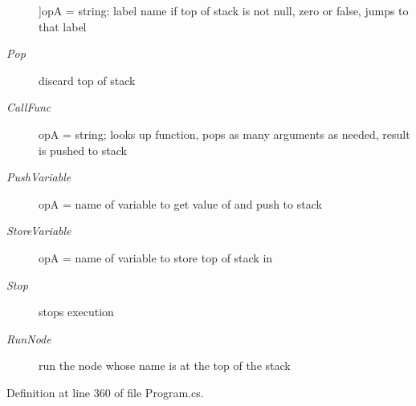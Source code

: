 \begin{Desc}
\begin{description}
{}]op\-A = string\-: label name if top of stack is not null, zero or false, jumps to that label \item[{\em 
\hypertarget{a00041_ad5dfb6ee68ca7469623ad3e459f98894a0ae61bd0474e04c9f1195d4baa0213a0}{Pop}\label{a00041_ad5dfb6ee68ca7469623ad3e459f98894a0ae61bd0474e04c9f1195d4baa0213a0}
}]discard top of stack \item[{\em 
\hypertarget{a00041_ad5dfb6ee68ca7469623ad3e459f98894a3b5e7e8300dc6e4b78cb865c5b10f01a}{Call\-Func}\label{a00041_ad5dfb6ee68ca7469623ad3e459f98894a3b5e7e8300dc6e4b78cb865c5b10f01a}
}]op\-A = string; looks up function, pops as many arguments as needed, result is pushed to stack \item[{\em 
\hypertarget{a00041_ad5dfb6ee68ca7469623ad3e459f98894ab8c46f65015a178516fadbb5ad6c2038}{Push\-Variable}\label{a00041_ad5dfb6ee68ca7469623ad3e459f98894ab8c46f65015a178516fadbb5ad6c2038}
}]op\-A = name of variable to get value of and push to stack \item[{\em 
\hypertarget{a00041_ad5dfb6ee68ca7469623ad3e459f98894a872dc050abaff4beb46e70dadd4088c2}{Store\-Variable}\label{a00041_ad5dfb6ee68ca7469623ad3e459f98894a872dc050abaff4beb46e70dadd4088c2}
}]op\-A = name of variable to store top of stack in \item[{\em 
\hypertarget{a00041_ad5dfb6ee68ca7469623ad3e459f98894a11a755d598c0c417f9a36758c3da7481}{Stop}\label{a00041_ad5dfb6ee68ca7469623ad3e459f98894a11a755d598c0c417f9a36758c3da7481}
}]stops execution \item[{\em 
\hypertarget{a00041_ad5dfb6ee68ca7469623ad3e459f98894ae956bcf888278c168ee9b106927ff6ac}{Run\-Node}\label{a00041_ad5dfb6ee68ca7469623ad3e459f98894ae956bcf888278c168ee9b106927ff6ac}
}]run the node whose name is at the top of the stack \end{description}
\end{Desc}


Definition at line 360 of file Program.\-cs.


